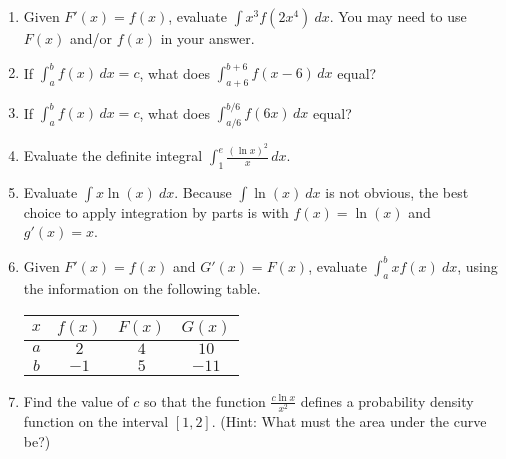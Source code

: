 \documentclass{article}
\begin{document}
                \begin{enumerate}
                    \item Given $F'(x)=f(x)$, evaluate $\displaystyle \int x^3f(2x^4)\ dx$. You may need to use $F(x)$ and/or $f(x)$ in your answer.
                    \item If $\displaystyle \int_a^b f(x)\,dx = c$, what does 
                    $\displaystyle \int_{a+6}^{b+6} f(x-6)\,dx$ equal?
                    \item If $\displaystyle \int_a^b f(x)\,dx = c$, what does 
                    $\displaystyle \int_{a/6}^{b/6} f(6x)\,dx$ equal?
                    \item Evaluate the definite integral 
                    $\displaystyle \int_{1}^{e} \frac{(\ln{x})^2}{x}\,dx$.
                    \item Evaluate $\displaystyle \int x\ln(x)\ dx$.  Because $\int \ln(x)\ dx$ is not obvious, the best choice to apply integration by parts is with $f(x)=\ln(x)$ and $g'(x)=x$.
                    \item Given $F'(x)=f(x)$ and $G'(x)=F(x)$, evaluate $\displaystyle \int_a^b xf(x)\ dx$, using the information on the following table. \\
                        \begin{center}
                        \begin{tabular}{|c|c|c|c|}
                        \hline
                        $x$ & $f(x)$ & $F(x)$ & $G(x)$ \\
                        \hline
                        $a$ & $2$ & $4$ & $10$ \\
                        \hline
                        $b$ & $-1$ & $5$ & $-11$ \\
                        \hline 
                        \end{tabular}
                        \end{center}
                        \medskip
                        
                    \item Find the value of $c$ so that the function 
                    $\displaystyle \frac{c\ln{x}}{x^2}$ defines a probability density function on the interval $[1,2]$. (Hint: What must the area under the curve be?)
                    

\end{enumerate}
\end{document}
